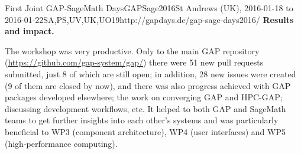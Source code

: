 \begin{event}{First Joint GAP-SageMath Days}{GAPSage2016}{St Andrews (UK),
2016-01-18 to 2016-01-22}{SA,PS,UV,UK,UO}{19}{http://gapdays.de/gap-sage-days2016/}
\textbf{Results and impact.} 

The workshop was very productive. Only to the main GAP repository 
(\url{https://github.com/gap-system/gap/}) there were 51 new pull 
requests submitted, just 8 of which are still open; in addition,
28 new issues were created (9 of them are closed by now), and 
there was also progress achieved with GAP packages developed 
elsewhere; the work on converging GAP and HPC-GAP; discussing 
development workflows, etc. It helped to both GAP and SageMath 
teams to get further insights into each other's systems and was 
particularly beneficial to WP3 (component architecture), WP4 
(user interfaces) and WP5 (high-performance computing). 

\end{event}